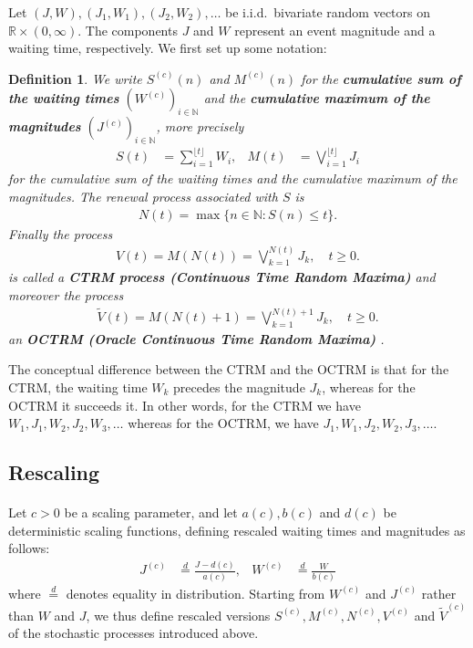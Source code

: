 \documentclass[12pt, a4paper]{article}
\newtheorem{definition}[equation]{Definition}
\newcommand{\N}{\mathbb{N}}
\newcommand{\1}{\mathbf 1}
\begin{document}
Let $(J,W),(J_1,W_1),(J_2,W_2), \ldots$ 
be i.i.d.\ bivariate random vectors on $\mathbb R \times (0, \infty)$. 
The components $J$ and $W$ represent an event magnitude and 
a waiting time, respectively. 
We first set up some notation: 


\begin{definition}
We write $S^{(c)}(n)$ and $M^{(c)}(n)$ for the \textbf{cumulative sum of the waiting times} $(W^{(c)})_{i \in \N}$ and the \textbf{cumulative maximum of the magnitudes} $(J^{(c)})_{i \in \N}$, more precisely 
\begin{align}
S(t) &= \sum_{i=1}^{\lfloor t \rfloor} W_i, 
&
M(t) &= \bigvee_{i=1}^{\lfloor t \rfloor} J_i
\end{align} 
for the cumulative sum of the waiting times and the cumulative maximum of the 
magnitudes. 
The renewal process associated with $S$ is 
\begin{align} \label{eq:renewal-process}
N(t) = \max\{n \in \mathbb N: S(n) \le t\}.
\end{align}
Finally the process
\begin{align}
V(t) 
= M\left( N(t) \right) 
= \bigvee_{k=1}^{N(t)} J_k, \quad t \ge 0.
\end{align}
is called a \textbf{CTRM process (Continuous Time Random Maxima)} and moreover the process
\begin{align}
\tilde V(t) 
= M\left( N(t) + 1 \right) 
= \bigvee_{k=1}^{N(t) + 1} J_k, \quad t \ge 0.
\end{align}
an \textbf{OCTRM (Oracle Continuous Time Random Maxima)}
.
\end{definition}

The conceptual difference between the CTRM and the OCTRM is that for the CTRM, 
the waiting time $W_k$ precedes the magnitude $J_k$, whereas for 
the OCTRM it succeeds it. In other words, for the CTRM we have 
$W_1, J_1, W_2, J_2, W_3, \ldots$ whereas for the
OCTRM, we have $J_1, W_1, J_2, W_2, J_3, \ldots$. 


\subsection{Rescaling}

\paragraph{}
Let $c > 0$ be a scaling parameter, and let 
$a(c), b(c)$ and $d(c)$ be deterministic scaling functions,
defining rescaled waiting times and magnitudes as follows: 
\begin{align}
J^{(c)} &\stackrel{d}{=} \frac{J - d(c)}{a(c)}, 
& 
W^{(c)} &\stackrel{d}{=} \frac{W}{b(c)}
\end{align}
where $\stackrel{d}{=}$ denotes equality in distribution. 
Starting from $W^{(c)}$ and $J^{(c)}$ rather than $W$ and $J$, we thus define rescaled 
versions $S^{(c)}, M^{(c)}, N^{(c)}, V^{(c)}$ and $\tilde V^{(c)}$ of the 
stochastic processes introduced above. 
\end{document}
